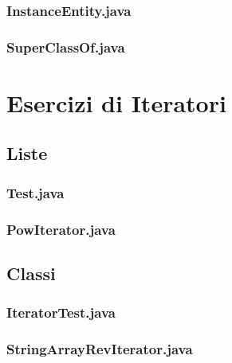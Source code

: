\documentclass[10pt]{article}
\begin{document}
        \subsubsection{InstanceEntity.java}
            
        \subsubsection{SuperClassOf.java}
            

\section{Esercizi di Iteratori}
    
        \subsection{Liste}
            \subsubsection{Test.java}
                
            \subsubsection{PowIterator.java}
                

        \subsection{Classi}
            \subsubsection{IteratorTest.java}
                
            \subsubsection{StringArrayRevIterator.java}
                
\end{document}
